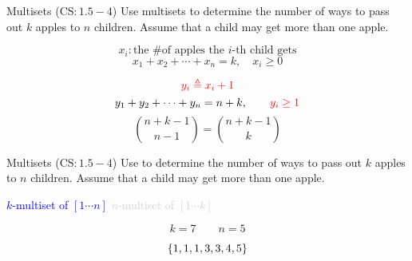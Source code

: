 
\begin{frame}{}
  \begin{exampleblock}{Multisets ($\text{CS}: 1.5-4$)}
    Use multisets to determine the number of ways to pass out $k$  apples to $n$ children. 
    Assume that a child may get more than one apple.
  \end{exampleblock}

  \pause
  \[
    x_i: \text{the \# of apples the $i$-th child gets}
  \]
  \[
    x_1 + x_2 + \cdots + x_n = k, \quad x_i \ge 0
  \]

  \pause
  \centerline{ \pause \quad {}}

  \pause
  \[
    \textcolor{red}{y_i \triangleq x_i + 1}
  \]
  \pause
  \[
    y_1 + y_2 + \cdots + y_n = n + k, \qquad \textcolor{red}{y_i \ge 1}
  \]
  \pause 
  \[
    \binom{n+k-1}{n-1} = \binom{n+k-1}{k}
  \]
\end{frame}

\begin{frame}{}
  \begin{exampleblock}{Multisets ($\text{CS}: 1.5-4$)}
    Use  to determine the number of ways to pass out $k$  apples to $n$ children. 
    Assume that a child may get more than one apple.
  \end{exampleblock}

  \pause
  \vspace{0.30cm}
  \centerline{ \textcolor<6->{blue}{$k$-multiset of $[1 \cdots n]$} \emph{} \textcolor<6->{lightgray}{$n$-multiset of $[1 \cdots k]$}}

  \pause
  \[
    k = 7 \qquad n = 5
  \]

  \pause

  \pause
  \vspace{-0.80cm}
  \[
    \{1,1,1,3,3,4,5\}
  \]
\end{frame}
